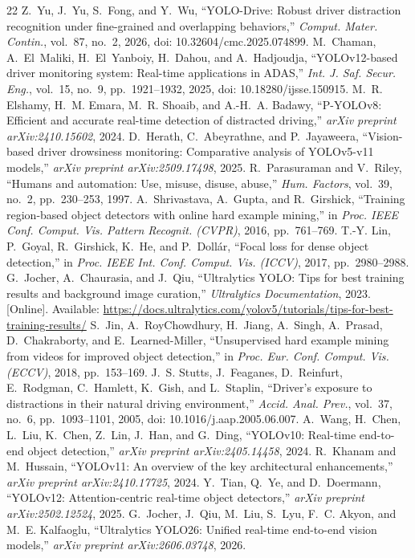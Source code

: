 \documentclass[conference]{IEEEtran}
\begin{document}
\begin{thebibliography}{22}
 Z.~Yu, J.~Yu, S.~Fong, and Y.~Wu, ``YOLO-Drive: Robust driver distraction recognition under fine-grained and overlapping behaviors,'' \emph{Comput. Mater. Contin.}, vol.~87, no.~2, 2026, doi: 10.32604/cmc.2025.074899.
 M.~Chaman, A.~El~Maliki, H.~El~Yanboiy, H.~Dahou, and A.~Hadjoudja, ``YOLOv12-based driver monitoring system: Real-time applications in ADAS,'' \emph{Int. J. Saf. Secur. Eng.}, vol.~15, no.~9, pp.~1921--1932, 2025, doi: 10.18280/ijsse.150915.
 M.~R. Elshamy, H.~M. Emara, M.~R. Shoaib, and A.-H.~A. Badawy, ``P-YOLOv8: Efficient and accurate real-time detection of distracted driving,'' \emph{arXiv preprint arXiv:2410.15602}, 2024.
 D.~Herath, C.~Abeyrathne, and P.~Jayaweera, ``Vision-based driver drowsiness monitoring: Comparative analysis of YOLOv5-v11 models,'' \emph{arXiv preprint arXiv:2509.17498}, 2025.
 R.~Parasuraman and V.~Riley, ``Humans and automation: Use, misuse, disuse, abuse,'' \emph{Hum. Factors}, vol.~39, no.~2, pp.~230--253, 1997.
 A.~Shrivastava, A.~Gupta, and R.~Girshick, ``Training region-based object detectors with online hard example mining,'' in \emph{Proc. IEEE Conf. Comput. Vis. Pattern Recognit. (CVPR)}, 2016, pp.~761--769.
 T.-Y. Lin, P.~Goyal, R.~Girshick, K.~He, and P.~Doll\'{a}r, ``Focal loss for dense object detection,'' in \emph{Proc. IEEE Int. Conf. Comput. Vis. (ICCV)}, 2017, pp.~2980--2988.
 G.~Jocher, A.~Chaurasia, and J.~Qiu, ``Ultralytics YOLO: Tips for best training results and background image curation,'' \emph{Ultralytics Documentation}, 2023. [Online]. Available: \url{https://docs.ultralytics.com/yolov5/tutorials/tips-for-best-training-results/}
 S.~Jin, A.~RoyChowdhury, H.~Jiang, A.~Singh, A.~Prasad, D.~Chakraborty, and E.~Learned-Miller, ``Unsupervised hard example mining from videos for improved object detection,'' in \emph{Proc. Eur. Conf. Comput. Vis. (ECCV)}, 2018, pp.~153--169.
 J.~S. Stutts, J.~Feaganes, D.~Reinfurt, E.~Rodgman, C.~Hamlett, K.~Gish, and L.~Staplin, ``Driver's exposure to distractions in their natural driving environment,'' \emph{Accid. Anal. Prev.}, vol.~37, no.~6, pp.~1093--1101, 2005, doi: 10.1016/j.aap.2005.06.007.
 A.~Wang, H.~Chen, L.~Liu, K.~Chen, Z.~Lin, J.~Han, and G.~Ding, ``YOLOv10: Real-time end-to-end object detection,'' \emph{arXiv preprint arXiv:2405.14458}, 2024.
 R.~Khanam and M.~Hussain, ``YOLOv11: An overview of the key architectural enhancements,'' \emph{arXiv preprint arXiv:2410.17725}, 2024.
 Y.~Tian, Q.~Ye, and D.~Doermann, ``YOLOv12: Attention-centric real-time object detectors,'' \emph{arXiv preprint arXiv:2502.12524}, 2025.
 G.~Jocher, J.~Qiu, M.~Liu, S.~Lyu, F.~C. Akyon, and M.~E. Kalfaoglu, ``Ultralytics YOLO26: Unified real-time end-to-end vision models,'' \emph{arXiv preprint arXiv:2606.03748}, 2026.
\end{thebibliography}
\end{document}
